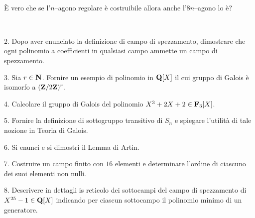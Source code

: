 \ \dotfill\ \bigskip\bigskip\bigskip\vfil

 \`E vero che se l'$n$--agono regolare \`e costruibile allora anche
l'$8n$--agono lo \`e?\medskip\bigskip\bigskip

\ \dotfill\ \bigskip\bigskip\bigskip


\vfil\eject


\item{2.} Dopo aver enunciato la definizione di campo di spezzamento, dimostrare 
che ogni polinomio a coefficienti in qualsiasi campo ammette un campo di spezzamento.
\vv


\item{3.} Sia $r\in{\bf N}$. Fornire un esempio di polinomio in ${\bf Q}[X]$ il cui gruppo di Galois
\`e isomorfo a $({\bf Z}/2{\bf Z})^r$.\ve\ \vs

\item{4.} Calcolare il gruppo di Galois del polinomio $X^3+2X+2\in{\bf F}_3[X]$. \vv

\item{5.} Fornire la definizione di sottogruppo transitivo di $S_n$ e spiegare l'utilit\`a di
tale nozione in Teoria di Galois.
\ve\ \vs

\item{6.} Si enunci e si dimostri il Lemma di Artin.\vskip 6cm\bigskip\bigskip\bigskip\vv\vv

\item{7.} Costruire un campo finito con $16$ elementi e determinare l'ordine di ciascuno dei suoi elementi non nulli.\vskip 6cm\bigskip\bigskip\bigskip\vv\vv



\item{8.} Descrivere in dettagli is reticolo dei sottocampi del campo di spezzamento di $X^{25}-1\in{\bf Q}[X]$ indicando per ciascun sottocampo il polinomio minimo di un generatore.
\ \vst

 \bye
